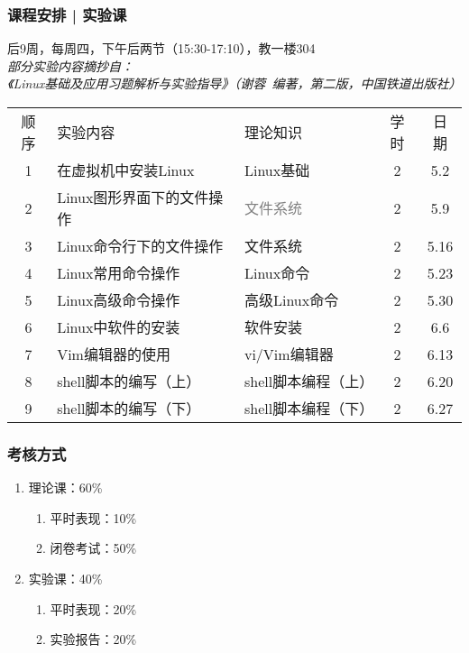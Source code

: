\begin{frame}
  \frametitle{课程安排 | 实验课}
  \begin{center}
  \alert{后9周，每周四，下午后两节（15:30-17:10），教一楼304}\\
  \vspace{0.2cm}
  {\footnotesize
  \textit{部分实验内容摘抄自：\\ 《Linux基础及应用习题解析与实验指导》（谢蓉\ 编著，第二版，中国铁道出版社）}
  }
  \end{center}
  \vspace{-0.5cm}
  \begin{table}
    \centering
    \begin{tabular}{cllcc}
      \hline
      \rowcolor{blue!50}顺序 & 实验内容 & 理论知识 & 学时 & 日期\\
      1 & 在虚拟机中安装Linux & Linux基础 & 2 & 5.2\\
      2 & Linux图形界面下的文件操作 & \textcolor{gray}{文件系统} & 2 & 5.9\\
      3 & Linux命令行下的文件操作 & 文件系统 & 2 & 5.16\\
      4 & Linux常用命令操作 & Linux命令 & 2 & 5.23\\
      5 & Linux高级命令操作 & 高级Linux命令 & 2 & 5.30\\
      6 & Linux中软件的安装 & 软件安装 & 2 & 6.6\\
      7 & Vim编辑器的使用 & vi/Vim编辑器 & 2 & 6.13\\
      8 & shell脚本的编写（上） & shell脚本编程（上） & 2 & 6.20\\
      9 & shell脚本的编写（下） & shell脚本编程（下） & 2 & 6.27\\
      \hline
    \end{tabular}
  \end{table}
\end{frame}

\begin{frame}
  \frametitle{考核方式}
  \begin{enumerate}
    \item 理论课：60\%
      \begin{enumerate}
        \item 平时表现：10\%
        \item 闭卷考试：50\%
      \end{enumerate}
    \item 实验课：40\%
      \begin{enumerate}
        \item 平时表现：20\%
        \item 实验报告：20\%
      \end{enumerate}
  \end{enumerate}
\end{frame}

